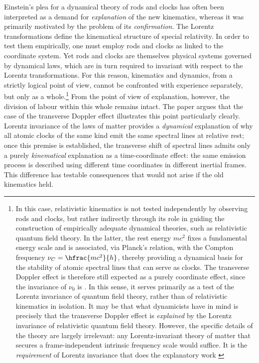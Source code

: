 \documentclass[pdflatex,sn-basic]{sn-jnl}
\newcommand{\tDe}{transverse Doppler effect\xspace}
\begin{document}
Einstein’s plea for a dynamical theory of rods and clocks has often been interpreted as a demand for \emph{explanation} of the new kinematics, whereas it was primarily motivated by the problem of its \emph{confirmation}. The Lorentz transformations define the kinematical structure of special relativity. In order to test them empirically, one must employ rods and clocks as linked to the coordinate system. Yet rods and clocks are themselves physical systems governed by dynamical laws, which are in turn required to invariant with respect to the Lorentz transformations. For this reason, kinematics and dynamics, from a strictly logical point of view, cannot be confronted with experience separately, but only as a whole.\footnote{In this case, relativistic kinematics is not tested independently by observing rods and clocks, but rather indirectly through its role in guiding the construction of empirically adequate dynamical theories, such as relativistic quantum field theory. In the latter, the rest energy $mc^{2}$ fixes a fundamental energy scale and is associated, via Planck’s relation, with the Compton frequency $\nu_C=\hfrac{mc^{2}}{h}$, thereby providing a dynamical basis for the stability of atomic spectral lines that can serve as clocks. The \tDe is therefore still expected as a purely coordinate effect, since the invariance of $\nu_0$ is . In this sense, it serves primarily as a test of the Lorentz invariance of quantum field theory, rather than of relativistic kinematics in isolation. It may be that what dynamicists have in mind is precisely that the \tDe is \emph{explained} by the Lorentz invariance of relativistic quantum field theory. However, the specific details of the theory are largely irrelevant: any Lorentz-invariant theory of matter that secures a frame-independent intrinsic frequency scale would suffice. It is the \emph{requirement} of Lorentz invariance that does the explanatory work \citep{Lange2016}} From the point of view of explanation, however, the division of labour within this whole remains intact. The paper argues that the case of the \tDe illustrates this point particularly clearly. Lorentz invariance of the laws of matter provides a \emph{dynamical} explanation of why all atomic clocks of the same kind emit the same spectral lines at relative rest; once this premise is established, the transverse shift of spectral lines admits only a purely \emph{kinematical} explanation as a time-coordinate effect: the same emission process is described using different time coordinates in different inertial frames. This  difference has  testable consequences that would not arise if the old kinematics held.



%




%
\end{document}
